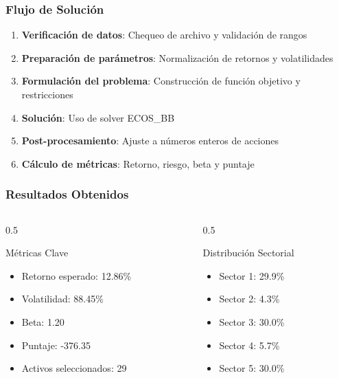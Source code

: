 \documentclass{beamer}
\begin{document}
\begin{frame}
\frametitle{Flujo de Solución}
\begin{enumerate}
\item \textbf{Verificación de datos}: Chequeo de archivo y validación de rangos
\item \textbf{Preparación de parámetros}: Normalización de retornos y volatilidades
\item \textbf{Formulación del problema}: Construcción de función objetivo y restricciones
\item \textbf{Solución}: Uso de solver ECOS\_BB
\item \textbf{Post-procesamiento}: Ajuste a números enteros de acciones
\item \textbf{Cálculo de métricas}: Retorno, riesgo, beta y puntaje
\end{enumerate}
\end{frame}

\begin{frame}
\frametitle{Resultados Obtenidos}
\begin{columns}
\begin{column}{0.5\textwidth}
\begin{block}{Métricas Clave}
\begin{itemize}
\item Retorno esperado: 12.86\%
\item Volatilidad: 88.45\%
\item Beta: 1.20
\item Puntaje: -376.35
\item Activos seleccionados: 29
\end{itemize}
\end{block}
\end{column}
\begin{column}{0.5\textwidth}
\begin{block}{Distribución Sectorial}
\begin{itemize}
\item Sector 1: 29.9\%
\item Sector 2: 4.3\%
\item Sector 3: 30.0\%
\item Sector 4: 5.7\%
\item Sector 5: 30.0\%
\end{itemize}
\end{block}
\end{column}
\end{columns}
\end{frame}
\end{document}
